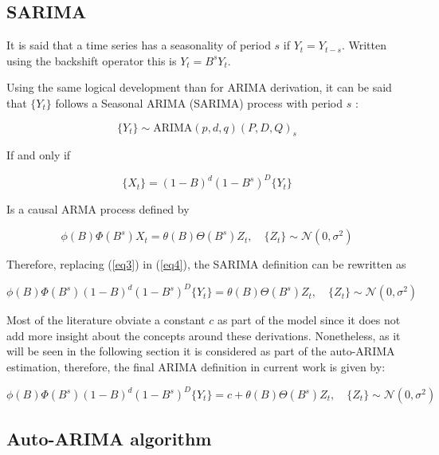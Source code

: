 \subsection{SARIMA}

 It is said that a time series has a seasonality of period $s$ if $Y_t = Y_{t-s}$. Written using the backshift operator this is $Y_t = B^sY_t$.
 
 Using the same logical development than for ARIMA derivation, it can be said that $\{Y_t\}$ follows a Seasonal ARIMA (SARIMA) process with period $s$ \cite{brockwell2016introduction} :
 
\begin{equation*}
 	\{Y_t\} \sim \text{ARIMA}(p,d,q)(P,D,Q)_s
\end{equation*}
 
 If and only if
 
\begin{equation}\label{eq3}
 	\{X_t\} = (1-B)^d (1-B^s)^D \{Y_t\}
\end{equation}

Is a causal ARMA process defined by 

\begin{equation}\label{eq4}
	\phi(B)\Phi(B^s)X_t = \theta(B)\Theta(B^s)Z_t , \quad\{Z_t\} \sim \mathcal{N}(0,\sigma^2)
\end{equation}

Therefore, replacing (\ref{eq3}) in (\ref{eq4}), the SARIMA definition can be rewritten as

\begin{equation*}\label{eq5}
	\phi(B)\Phi(B^s)(1-B)^d (1-B^s)^D \{Y_t\} = \theta(B)\Theta(B^s)Z_t , \quad\{Z_t\} \sim \mathcal{N}(0,\sigma^2)
\end{equation*}

Most of the literature obviate a constant $c$ as part of the model since it does not add more insight about the concepts around these derivations. Nonetheless, as it will be seen in the following section it is considered as part of the auto-ARIMA estimation, therefore, the final ARIMA definition in current work is given by:

\begin{equation}\label{eq:sarima}
	\phi(B)\Phi(B^s)(1-B)^d (1-B^s)^D \{Y_t\} = c + \theta(B)\Theta(B^s)Z_t , \quad\{Z_t\} \sim \mathcal{N}(0,\sigma^2)
\end{equation}


\subsection{Auto-ARIMA algorithm}

